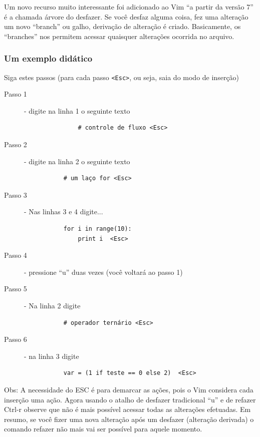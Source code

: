 \documentclass[10pt,a4paper,openany]{book}
\begin{document}
Um novo recurso muito interessante foi adicionado ao Vim ``a partir da
versão 7''  é a chamada árvore do desfazer.  Se
você desfaz alguma coisa, fez uma alteração um novo ``branch'' ou
galho, derivação de alteração é criado.  Basicamente, os ``branches''
nos permitem acessar quaisquer alterações ocorrida no arquivo.

\subsubsection{Um exemplo didático}
\label{Um exemplo didático}

Siga estes passos (para cada passo \verb|<Esc>|, ou seja, saia do modo
de inserção)


\begin{description}
\item [Passo 1] - digite na linha 1 o seguinte texto
\begin{verbatim}
			   # controle de fluxo <Esc>
\end{verbatim}

\item [Passo 2] - digite na linha 2 o seguinte texto
\begin{verbatim}
		   # um laço for <Esc>
\end{verbatim}

\item [Passo 3] - Nas linhas 3 e 4 digite...

\begin{verbatim}
		   for i in range(10):
			   print i  <Esc>
\end{verbatim}

\item [Passo 4] - pressione ``u'' duas vezes (você voltará ao passo 1)
\item [Passo 5] - Na linha 2 digite

\begin{verbatim}
		   # operador ternário <Esc>
\end{verbatim}

\item [Passo 6] - na linha 3 digite

\begin{verbatim}
		   var = (1 if teste == 0 else 2)  <Esc>
\end{verbatim}

\end{description}

Obs: A necessidade do ESC é para demarcar as ações, pois o Vim
considera cada inserção uma ação.  Agora usando o atalho de desfazer
tradicional ``u'' e de refazer Ctrl-r observe que não é mais possível
acessar todas as alterações efetuadas. Em resumo, se você fizer uma
nova alteração após um desfazer (alteração derivada) o comando refazer
não mais vai ser possível para aquele momento. \\
\end{document}

